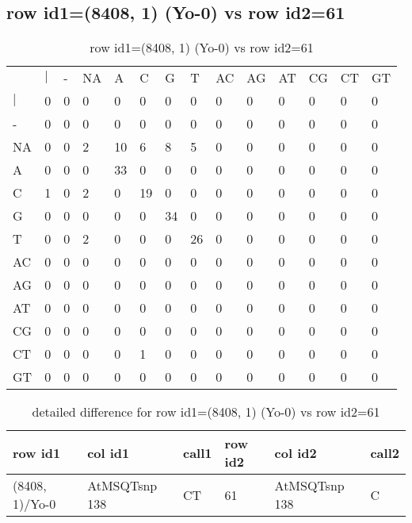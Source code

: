 \subsection{row id1=(8408, 1) (Yo-0) vs row id2=61}
\begin{center}
\begin{longtable}{|l|l|l|l|l|l|l|l|l|l|l|l|l|l|}
\caption{row id1=(8408, 1) (Yo-0) vs row id2=61} \label{table_dm484}\\
\hline
\\
\hline
&$|$&-&NA&A&C&G&T&AC&AG&AT&CG&CT&GT\\
$|$&0&0&0&0&0&0&0&0&0&0&0&0&0\\
-&0&0&0&0&0&0&0&0&0&0&0&0&0\\
NA&0&0&2&10&6&8&5&0&0&0&0&0&0\\
A&0&0&0&33&0&0&0&0&0&0&0&0&0\\
C&1&0&2&0&19&0&0&0&0&0&0&0&0\\
G&0&0&0&0&0&34&0&0&0&0&0&0&0\\
T&0&0&2&0&0&0&26&0&0&0&0&0&0\\
AC&0&0&0&0&0&0&0&0&0&0&0&0&0\\
AG&0&0&0&0&0&0&0&0&0&0&0&0&0\\
AT&0&0&0&0&0&0&0&0&0&0&0&0&0\\
CG&0&0&0&0&0&0&0&0&0&0&0&0&0\\
CT&0&0&0&0&1&0&0&0&0&0&0&0&0\\
GT&0&0&0&0&0&0&0&0&0&0&0&0&0\\
\hline
\end{longtable}
\end{center}

\begin{center}
\begin{longtable}{|l|l|l|l|l|l|}
\caption{detailed difference for row id1=(8408, 1) (Yo-0) vs row id2=61} \label{table_dm485}\\
\hline
row id1&col id1&call1&row id2&col id2&call2\\
\hline
(8408, 1)/Yo-0&AtMSQTsnp 138&CT&61&AtMSQTsnp 138&C\\
\hline
\end{longtable}
\end{center}

